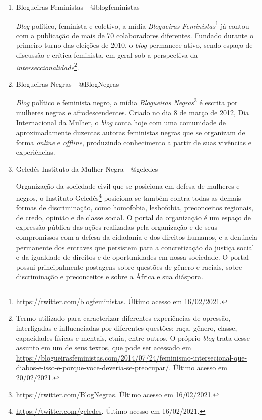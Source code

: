 \documentclass[
	12pt,				%
	openright,			%
	twoside,			%
	a4paper,			%
	english,			%
	brazil				%
	]{abntex2}
\begin{document}
\begin{anexosenv}
\begin{enumerate}
 \item Blogueiras Feministas - @blogfeministas\label{blogfeministas}
 
 \textit{Blog} político, feminista e coletivo, a mídia \textit{Blogueiras Feministas}\footnote{\url{https://twitter.com/blogfeministas}. Último acesso em 16/02/2021.} já contou com a publicação de mais de 70 colaboradores diferentes. Fundado durante o primeiro turno das eleições de 2010, o \textit{blog} permanece ativo, sendo espaço de discussão e crítica feminista, em geral sob a perspectiva da \textit{interseccionalidade}\footnote{Termo utilizado para caracterizar diferentes experiências de opressão, interligadas e influenciadas por diferentes questões: raça, gênero, classe, capacidades físicas e mentais, etnia, entre outros. O próprio \textit{blog} trata desse assunto em um de seus textos, que pode ser acessado em \url{https://blogueirasfeministas.com/2014/07/24/feminismo-intersecional-que-diabos-e-isso-e-porque-voce-deveria-se-preocupar/}. Último acesso em 20/02/2021.}.
 
 \item Blogueiras Negras - @BlogNegras
 
 \textit{Blog} político e feminista negro, a mídia \textit{Blogueiras Negras}\footnote{\url{https://twitter.com/BlogNegras}. Último acesso em 16/02/2021.} é escrita por mulheres negras e afrodescendentes. Criado no dia 8 de março de 2012, Dia Internacional da Mulher, o \textit{blog} conta hoje com uma comunidade de aproximadamente duzentas autoras feministas negras que se organizam de forma \textit{online} e \textit{offline}, produzindo conhecimento a partir de suas vivências e experiências.

 \item Geledés Instituto da Mulher Negra - @geledes
 
 Organização da sociedade civil que se posiciona em defesa de mulheres e negros, o Instituto Geledés\footnote{\url{https://twitter.com/geledes}. Último acesso em 16/02/2021.} posiciona-se também contra todas as demais formas de discriminação, como homofobia, lesbofobia, preconceitos regionais, de credo, opinião e de classe social. O portal da organização é um espaço de expressão pública das ações realizadas pela organização e de seus compromissos com a defesa da cidadania e dos direitos humanos, e a denúncia permanente dos entraves que persistem para a concretização da justiça social e da igualdade de direitos e de oportunidades em nossa sociedade. O portal possui principalmente postagens sobre questões de gênero e raciais, sobre discriminação e preconceitos e sobre a África e sua diáspora.


\end{enumerate}
\end{anexosenv}
\end{document}
